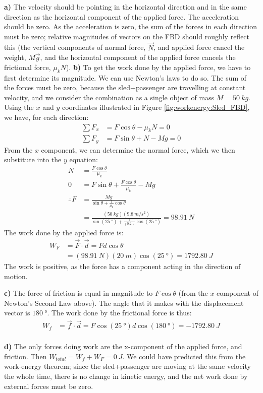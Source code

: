 \begin{solution}
\textbf{a)} The velocity should be pointing in the horizontal direction and in the same direction as the horizontal component of the applied force. The acceleration should be zero. As the acceleration is zero, the sum of the forces in each direction must be zero; relative magnitudes of vectors on the FBD should roughly reflect this (the vertical components of normal force, $\vec N$, and applied force cancel the weight, $M\vec g$, and the horizontal component of the applied force cancels the frictional force, $\mu_kN$).
\textbf{b)} To get the work done by the applied force, we have to first determine its magnitude. We can use Newton's laws to do so. The sum of the forces must be zero, because the sled+passenger are travelling at constant velocity, and we consider the combination as a single object of mass $M=\SI{50}{kg}$. Using the $x$ and $y$ coordinates illustrated in Figure \ref{fig:workenergy:Sled_FBD}, we have, for each direction:
\begin{align*}
\sum F_x &= F\cos\theta-\mu_kN = 0 \\
\sum F_y &= F\sin\theta+N-Mg = 0
\end{align*}
From the $x$ component, we can determine the normal force, which we then substitute into the $y$ equation:
\begin{align*}
N&=\frac{F\cos\theta}{\mu_k}\\
0&=F\sin\theta+\frac{F\cos\theta}{\mu_k}-Mg\\
\therefore F&=\frac{Mg}{\sin\theta+\frac{1}{\mu_k}\cos\theta}\\
&=\frac{(\SI{50}{kg})(\SI{9.8}{m/s^2})}{\sin(\SI{25}{\degree})+\frac{1}{(0.2)}\cos(\SI{25}{\degree})}=\SI{98.91}{N}
\end{align*}
The work done by the applied force is:
\begin{align*}
W_F&=\vec F\cdot\vec d=Fd\cos\theta\\
&=(\SI{98.91}{N})(\SI{20}{m})\cos(\SI{25}{\degree})=\SI{1792.80}{J}
\end{align*}
The work is positive, as the force has a component acting in the direction of motion.

\textbf{c)} The force of friction is equal in magnitude to $F\cos\theta$ (from the $x$ component of Newton's Second Law above). The angle that it makes with the displacement vector is $\SI{180}{\degree}$. The work done by the frictional force is thus:
\begin{align*}
W_f&=\vec f\cdot\vec d=F\cos(\SI{25}{\degree})d\cos(\SI{180}{\degree})=\SI{-1792.80}{J}\\
\end{align*}

\textbf{d)} The only forces doing work are the x-component of the applied force, and friction. Then $W_{total}=W_f+W_{F}=\SI{0}{J}$. We could have predicted this from the work-energy theorem; since the sled+passenger are moving at the same velocity the whole time, there is no change in kinetic energy, and the net work done by external forces must be zero.
\end{solution}
